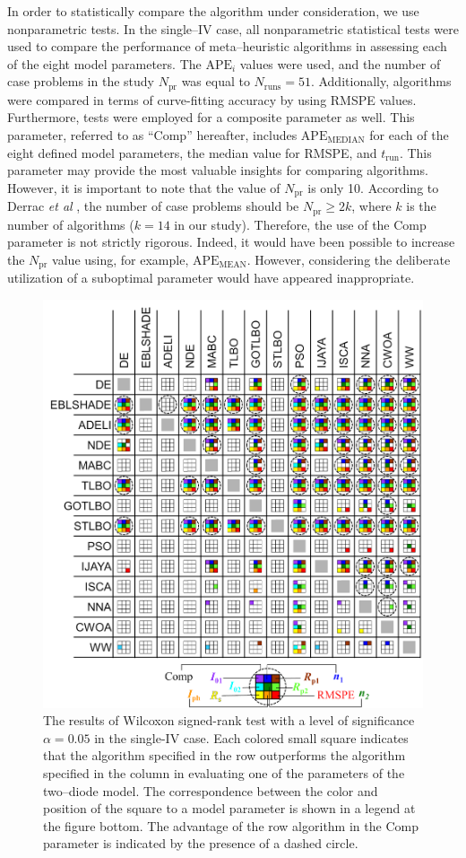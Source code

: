 \documentclass[a4paper,fleqn]{cas-sc}
\begin{document}
In order to statistically compare the algorithm under consideration, we use nonparametric tests.
In the single--IV case, all nonparametric statistical tests were used to compare the performance of meta--heuristic algorithms in assessing each of the eight model parameters.
The $\mathrm{APE}_i$ values were used, and the number of case problems in the study $N_\mathrm{pr}$ was equal to $N_\mathrm{runs}=51$.
Additionally, algorithms were compared in terms of curve-fitting accuracy by using RMSPE values.
Furthermore, tests were employed for a composite parameter as well.
This parameter, referred to as ``Comp'' hereafter, includes $\mathrm{APE}_\mathrm{MEDIAN}$ for each of the eight defined model parameters,
the median value for RMSPE, and $t_\mathrm{run}$.
This parameter may provide the most valuable insights for comparing algorithms. However, it is important to note that the value of $N_\mathrm{pr}$ is only 10.
According to Derrac \emph{et al} \cite{Derrac2011}, the number of case problems should be $N_\mathrm{pr}\geq 2k$,
where $k$ is the number of algorithms ($k=14$ in our study).
Therefore, the use of the Comp parameter is not strictly rigorous.
Indeed, it would have been possible to increase the $N_\mathrm{pr}$ value using, for example, $\mathrm{APE}_\mathrm{MEAN}$.
However, considering the deliberate utilization of a suboptimal parameter would have appeared inappropriate.



\begin{figure}[]
	\centering
		\includegraphics[width=0.45\columnwidth]{Fig4}
	  \caption{The results of Wilcoxon signed-rank test with a level of significance $\alpha = 0.05$ in the single-IV case.
               Each colored small square indicates that the algorithm specified in the row outperforms the algorithm
               specified in the column in evaluating one of the parameters of the two--diode model.
               The correspondence between the color and position of the square to a model parameter
               is shown in a legend at the figure bottom.
               The advantage of the row algorithm in the Comp parameter is indicated by the presence of a dashed circle.}\label{figWilSingleIV}
\end{figure}
\end{document}
